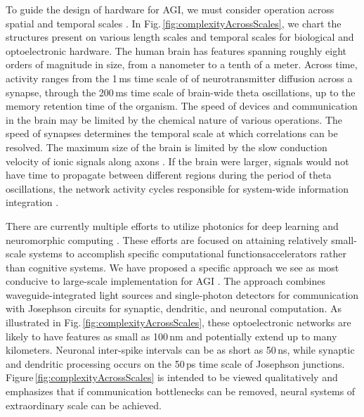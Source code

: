\documentclass[twocolumn]{article}
\begin{document}
To guide the design of hardware for AGI, we must consider operation across spatial and temporal scales \cite{beba2016}. In Fig.\,\ref{fig:complexityAcrossScales}, we chart the structures present on various length scales and temporal scales for biological and optoelectronic hardware. The human brain has features spanning roughly eight orders of magnitude in size, from a nanometer to a tenth of a meter. Across time, activity ranges from the 1\,ms time scale of of neurotransmitter diffusion across a synapse, through the 200\,ms time scale of brain-wide theta oscillations, up to the memory retention time of the organism. The speed of devices and communication in the brain may be limited by the chemical nature of various operations. The speed of synapses determines the temporal scale at which correlations can be resolved. The maximum size of the brain is limited by the slow conduction velocity of ionic signals along axons \cite{bu2006,shICRC2018}. If the brain were larger, signals would not have time to propagate between different regions during the period of theta oscillations, the network activity cycles responsible for system-wide information integration \cite{bu2006}. 

There are currently multiple efforts to utilize photonics for deep learning \cite{shha2016,chsa2018} and neuromorphic computing \cite{padu2011,prsh2017}. These efforts are focused on attaining relatively small-scale systems to accomplish specific computational functions\textemdash accelerators rather than cognitive systems. We have proposed a specific approach we see as most conducive to large-scale implementation for AGI \cite{sh2018,sh2018_full,shICRC2018}. The approach combines waveguide-integrated light sources and single-photon detectors for communication with Josephson circuits for synaptic, dendritic, and neuronal computation. As illustrated in Fig.\,\ref{fig:complexityAcrossScales}, these optoelectronic networks are likely to have features as small as 100\,nm and potentially extend up to many kilometers. Neuronal inter-spike intervals can be as short as 50\,ns, while synaptic and dendritic processing occurs on the 50\,ps time scale of Josephson junctions. Figure\,\ref{fig:complexityAcrossScales} is intended to be viewed qualitatively and emphasizes that if communication bottlenecks can be removed, neural systems of extraordinary scale can be achieved.
\end{document}
